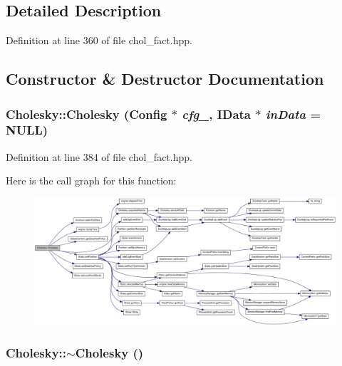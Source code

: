 \subsection{Detailed Description}


Definition at line 360 of file chol\_\-fact.hpp.

\subsection{Constructor \& Destructor Documentation}
\hypertarget{class_cholesky_ae3a7112a8c31a3a11ce7ff63f8940f9d}{
\subsubsection[{Cholesky}]{\setlength{\rightskip}{0pt plus 5cm}Cholesky::Cholesky ({\bf Config} $\ast$ {\em cfg\_\-}, \/  {\bf IData} $\ast$ {\em inData} = {\ttfamily NULL})}}
\label{class_cholesky_ae3a7112a8c31a3a11ce7ff63f8940f9d}


Definition at line 384 of file chol\_\-fact.hpp.

Here is the call graph for this function:\nopagebreak
\begin{figure}[H]
\begin{center}
\leavevmode
\includegraphics[width=420pt]{class_cholesky_ae3a7112a8c31a3a11ce7ff63f8940f9d_cgraph}
\end{center}
\end{figure}
\hypertarget{class_cholesky_aed950ac074bea0a0df52749af3944d6a}{
\subsubsection[{$\sim$Cholesky}]{\setlength{\rightskip}{0pt plus 5cm}Cholesky::$\sim$Cholesky ()}}
\label{class_cholesky_aed950ac074bea0a0df52749af3944d6a}


